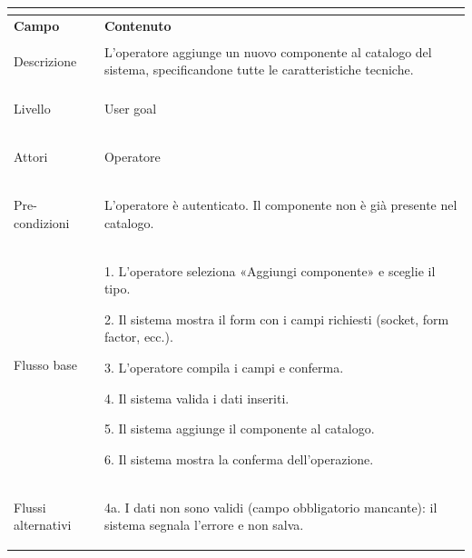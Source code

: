 \documentclass[11pt, a4paper]{article}
\begin{document}
\vspace{10pt}




\noindent

\begin{tabularx}{\textwidth}{|>{\bfseries}p{3.8cm}|X|}

\hline

\multicolumn{2}{|l|}{\textbf{UC9 --- Aggiungi al catalogo}} \\

\hline

Campo & \textbf{Contenuto} \\

\hline

Descrizione & L'operatore aggiunge un nuovo componente al catalogo del sistema, specificandone tutte le caratteristiche tecniche. \\

\hline

Livello & User goal \\

\hline

Attori & Operatore \\

\hline

Pre-condizioni & L'operatore è autenticato. Il componente non è già presente nel catalogo. \\

\hline

Flusso base & 

1. L'operatore seleziona «Aggiungi componente» e sceglie il tipo.\newline

2. Il sistema mostra il form con i campi richiesti (socket, form factor, ecc.).\newline

3. L'operatore compila i campi e conferma.\newline

4. Il sistema valida i dati inseriti.\newline

5. Il sistema aggiunge il componente al catalogo.\newline

6. Il sistema mostra la conferma dell'operazione. \\

\hline

Flussi alternativi & 

4a. I dati non sono validi (campo obbligatorio mancante): il sistema segnala l'errore e non salva.\newline


\end{tabularx}
\end{document}
